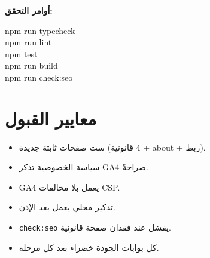 \documentclass[11pt]{article}
\begin{document}
\vspace{6pt}
\textbf{أوامر التحقق:}
\begin{codebox}
{\ttfamily\small\raggedleft
npm run typecheck\\
npm run lint\\
npm test\\
npm run build\\
npm run check:seo
}
\end{codebox}

\section{معايير القبول}

\begin{itemize}
  \item[${\color{okgreen}\faCheckCircle}$] ست صفحات ثابتة جديدة (4 قانونية + about + ربط).
  \item[${\color{okgreen}\faCheckCircle}$] سياسة الخصوصية تذكر GA4 صراحةً.
  \item[${\color{okgreen}\faCheckCircle}$] GA4 يعمل بلا مخالفات CSP.
  \item[${\color{okgreen}\faCheckCircle}$] تذكير محلي يعمل بعد الإذن.
  \item[${\color{okgreen}\faCheckCircle}$] \texttt{check:seo} يفشل عند فقدان صفحة قانونية.
  \item[${\color{okgreen}\faCheckCircle}$] كل بوابات الجودة خضراء بعد كل مرحلة.
\end{itemize}
\end{document}
